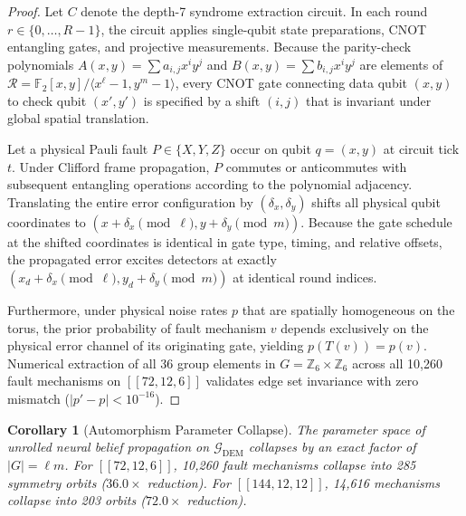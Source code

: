 \documentclass[journal]{IEEEtran}
\newtheorem{corollary}{Corollary}
\begin{document}
\begin{proof}
Let $C$ denote the depth-7 syndrome extraction circuit. In each round $r \in \{0, \dots, R-1\}$, the circuit applies single-qubit state preparations, CNOT entangling gates, and projective measurements. Because the parity-check polynomials $A(x, y) = \sum a_{i,j} x^i y^j$ and $B(x, y) = \sum b_{i,j} x^i y^j$ are elements of $\mathcal{R} = \mathbb{F}_2[x, y] / \langle x^\ell - 1, y^m - 1 \rangle$, every CNOT gate connecting data qubit $(x, y)$ to check qubit $(x', y')$ is specified by a shift $(i, j)$ that is invariant under global spatial translation.

Let a physical Pauli fault $P \in \{X, Y, Z\}$ occur on qubit $q = (x, y)$ at circuit tick $t$. Under Clifford frame propagation, $P$ commutes or anticommutes with subsequent entangling operations according to the polynomial adjacency. Translating the entire error configuration by $(\delta_x, \delta_y)$ shifts all physical qubit coordinates to $(x + \delta_x \pmod \ell, y + \delta_y \pmod m)$. Because the gate schedule at the shifted coordinates is identical in gate type, timing, and relative offsets, the propagated error excites detectors at exactly $(x_d + \delta_x \pmod \ell, y_d + \delta_y \pmod m)$ at identical round indices.

Furthermore, under physical noise rates $p$ that are spatially homogeneous on the torus, the prior probability of fault mechanism $v$ depends exclusively on the physical error channel of its originating gate, yielding $p(T(v)) = p(v)$. Numerical extraction of all 36 group elements in $G = \mathbb{Z}_6 \times \mathbb{Z}_6$ across all 10,260 fault mechanisms on $[[72,12,6]]$ validates edge set invariance with zero mismatch ($|p' - p| < 10^{-16}$).
\end{proof}

\begin{corollary}[Automorphism Parameter Collapse]
The parameter space of unrolled neural belief propagation on $\mathcal{G}_{\text{DEM}}$ collapses by an exact factor of $|G| = \ell m$. For $[[72,12,6]]$, 10,260 fault mechanisms collapse into 285 symmetry orbits ($36.0\times$ reduction). For $[[144,12,12]]$, 14,616 mechanisms collapse into 203 orbits ($72.0\times$ reduction).
\end{corollary}
\end{document}
